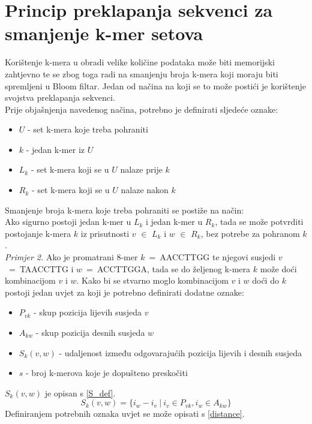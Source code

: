\documentclass[times, utf8, seminar, numeric]{fer}
\begin{document}
\chapter{Princip preklapanja sekvenci za smanjenje k-mer setova}
Korištenje k-mera u obradi velike količine podataka može biti memorijski zahtjevno
te se zbog toga radi na smanjenju broja k-mera koji moraju biti spremljeni u
Bloom filtar. Jedan od načina na koji se to može postići je korištenje svojstva
preklapanja sekvenci.\\
Prije objašnjenja navedenog načina, potrebno je definirati sljedeće oznake:
\begin{itemize}
  \item{{$U$} - set k-mera koje treba pohraniti}
  \item{{$k$} - jedan k-mer iz {$U$}}
  \item{{$L_k$} - set k-mera koji se u {$U$} nalaze prije {$k$}}
  \item{{$R_k$} - set k-mera koji se u {$U$} nalaze nakon {$k$}}
\end{itemize}
Smanjenje broja k-mera koje treba pohraniti se postiže na način:\\
Ako sigurno postoji jedan k-mer u {$L_k$} i jedan k-mer u {$R_k$}, tada se može
potvrditi postojanje k-mera {$k$} iz prisutnosti {$v$} {$\in$} {$L_k$} i
{$w$} {$\in$} {$R_k$}, bez potrebe za pohranom {$k$}.\\
\textit{Primjer 2.} Ako je promatrani 8-mer {$k$}~=~AACCTTGG te njegovi susjedi
{$v$}~=~TAACCTTG i {$w$}~=~ACCTTGGA, tada se do željenog k-mera {$k$} može doći
kombinacijom {$v$} i {$w$}.
Kako bi se stvarno moglo kombinacijom {$v$} i {$w$} doći do {$k$} postoji jedan
uvjet za koji je potrebno definirati dodatne oznake:
\begin{itemize}
  \item{{$P_{vk}$} - skup pozicija lijevih susjeda {$v$}}
  \item{{$A_{kw}$} - skup pozicija desnih susjeda {$w$}}
  \item{{$S_{k}(v,w)$} - udaljenost između odgovarajućih pozicija lijevih i
    desnih susjeda}
  \item{{$s$} - broj k-merova koje je dopušteno preskočiti}
\end{itemize}
$S_{k}(v,w)$ je opisan s \ref{S_def}.
\begin{equation}
  \label{S_def}
  S_k(v,w) = \{i_w - i_v~|~i_v \in P_{vk}, i_w \in A_{kw}\}
\end{equation}
Definiranjem potrebnih oznaka uvjet se može opisati s \ref{distance}.
\end{document}
